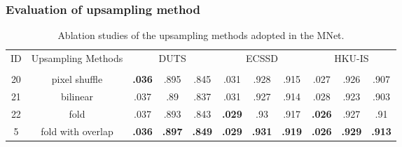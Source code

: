 \documentclass[lettersize,journal]{IEEEtran}
\begin{document}
\subsubsection{Evaluation of upsampling method}
\begin{table}
	\centering
	\scriptsize
	\caption{Ablation studies of the upsampling methods adopted in the MNet. }
	\label{tab:ablation_up}
	\setlength\tabcolsep{0.3mm}
	\begin{tabular}{c|c|ccc|ccc|ccc}\hline
		\multirow{2}{*}{ID} & \multirow{2}{*}{Upsampling Methods} & \multicolumn{3}{c|}{DUTS} & \multicolumn{3}{c|}{ECSSD} & \multicolumn{3}{c}{HKU-IS}\\
		&&  &  &  &  &  &  &  &  &  \\
		\hline
		20 & pixel shuffle & \textbf{.036} & .895 & .845 & .031& .928 & .915 & .027 & .926 & .907 \\ 
		21 & bilinear & .037 & .89 & .837 & .031 & .927 & .914 & .028 & .923 & .903 \\
22 & fold & .037 & .893 & .843 & \textbf{.029} & .93 & .917 & \textbf{.026} & {.927} & .91 \\
		5 & fold with overlap & \textbf{.036} & \textbf{.897} & \textbf{.849} & \textbf{.029} & \textbf{.931} & \textbf{.919} & \textbf{.026} & \textbf{.929} & \textbf{.913} \\
		\hline
	\end{tabular}
\end{table}
\end{document}

